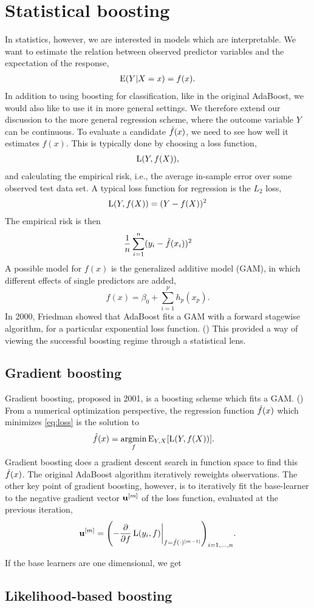 \section{Statistical boosting}\label{sec:sboost}
In statistics, however, we are interested in models which are interpretable. We want to estimate the relation between observed predictor variables and the expectation of the response,
\begin{align}
    \operatorname{E}(Y|X=x)=f(x).
\end{align}
In addition to using boosting for classification, like in the original AdaBoost, we would also like to use it in more general settings. We therefore extend our discussion to the more general regression scheme, where the outcome variable $Y$ can be continuous. To evaluate a candidate $\hat{f}(x)$, we need to see how well it estimates $f(x)$. This is typically done by choosing a loss function,
\begin{align}\label{eq:loss}
    \operatorname{L}(Y, f(X)),
\end{align}
and calculating the empirical risk, i.e., the average in-sample error over some observed test data set. A typical loss function for regression is the $L_2$ loss,
\begin{align}
    \operatorname{L}(Y, f(X))=(Y-f(X))^2
\end{align}
The empirical risk is then
\begin{align}
    \frac{1}{n}\sum_{i=1}^n (y_i-\hat{f}(x_i))^2
\end{align}
A possible model for $f(x)$ is the generalized additive model (GAM), in which different effects of single predictors are added,
\begin{equation}\label{eq:gam}
    f(x)=\beta_0+\sum_{i=1}^p h_p(x_p).
\end{equation}
In 2000, Friedman showed that AdaBoost fits a GAM with a forward stagewise algorithm, for a particular exponential loss function. (\cite{friedman2000}) This provided a way of viewing the successful boosting regime through a statistical lens.

\subsection{Gradient boosting}
Gradient boosting, proposed in 2001, is a boosting scheme which fits a GAM. (\cite{friedman2001}) From a numerical optimization perspective, the regression function $\hat{f}(x)$ which minimizes \eqref{eq:loss} is the solution to
\begin{align}
    \hat{f}(x)&=\underset{f}{\operatorname{argmin}}\,{\operatorname{E}_{Y,X}[\operatorname{L}(Y,f(X))]}.
\end{align}
Gradient boosting does a gradient descent search in function space to find this $\hat{f}(x)$. The original AdaBoost algorithm iteratively reweights observations. The other key point of gradient boosting, however, is to iteratively fit the base-learner to the negative gradient vector $\mathbf{u}^{[m]}$ of the loss function, evaluated at the previous iteration,
\begin{align}
    \u^{[m]}=\p*{-\frac{\pd}{\pd f}\loss(y_i,f)\at_{f=\fh(\cdot)^{[m-1]}}}_{i=1,\dots,n}.
\end{align}

If the base learners are one dimensional, we get 

\subsection{Likelihood-based boosting}